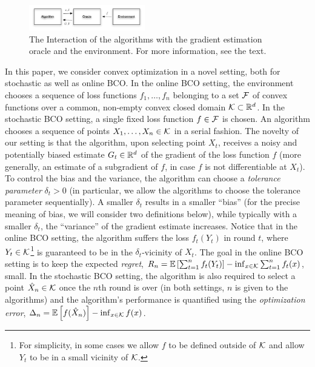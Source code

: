 \begin{figure}
\begin{center}
\vspace{-0.1cm}
\includegraphics[width=0.45\textwidth]{../figs/oracle}
\end{center}
\vspace{-0.6cm}
\caption{The Interaction of the algorithms with the gradient estimation oracle and the environment. For more information, see the text. \vspace{-0.3cm}}
\label{fig:oracle}
\end{figure}

In this paper, we consider convex optimization in a novel setting, both for stochastic as well as online BCO.
In the online BCO setting, the environment chooses a sequence of loss functions $f_1,\dots,f_n$ belonging to a set $\mathcal{F}$ of convex functions over a common, non-empty convex closed domain $\mathcal{K}\subset \mathbb{R}^d$.
In the stochastic BCO setting, a single fixed loss function $f\in \mathcal{F}$ is chosen.
An algorithm chooses a sequence of points $X_1,\dots,X_n\in \mathcal{K}$ in a serial fashion.
The novelty of our setting is that the algorithm, upon selecting point $X_t$, receives
a noisy and potentially biased estimate $G_t\in \mathbb{R}^d$
of the gradient of the loss function $f$
(more generally, an estimate of a subgradient of $f$, in case $f$ is not differentiable at $X_t$).
To control the bias and the variance, the algorithm can choose a \emph{tolerance parameter} $\delta_t>0$
(in particular, we allow the algorithms to choose the tolerance parameter sequentially).
A smaller $\delta_t$ results in a smaller ``bias'' (for the precise meaning of bias, we will consider two definitions below), while typically with a smaller $\delta_t$, the ``variance'' of the gradient estimate increases.
Notice that in the online BCO setting, the algorithm suffers the loss $f_t(Y_t)$ in round $t$, where $Y_t\in \mathcal{K}$\footnote{For simplicity, in some cases we allow $f$ to be defined outside of $\mathcal{K}$ and allow $Y_t$ to be in a small vicinity of $\mathcal{K}$.} is guaranteed to be in the $\delta_t$-vicinity of $X_t$.
The goal in the online BCO setting is to keep the expected \emph{regret},
	$R_n =\mathbb{E}\left[ \sum_{t=1}^n f_t(Y_t)\right] - \inf_{x\in \mathcal{K}} \sum_{t=1}^n f_t(x)$,
small.
In the stochastic BCO setting, the algorithm is also required to select a point $\hat{X}_n\in \mathcal{K}$ once
the $n$th round is over (in both settings, $n$ is given to the algorithms)
and the algorithm's performance is quantified using the \emph{optimization error},
$\Delta_n = \mathbb{E}\left[f(\hat{X}_n)\right] - \inf_{x\in \mathcal{K}} f(x) $.

